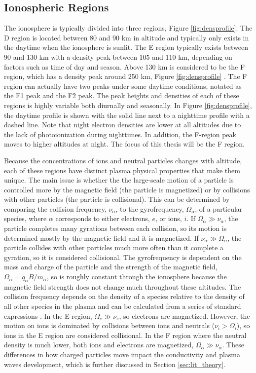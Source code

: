 \subsection{Ionospheric Regions}
\label{sec:ionosphere_regions}
The ionosphere is typically divided into three regions, Figure \ref{fig:densprofile}.  The D region is located between 80 and 90 km in altitude and typically only exists in the daytime when the ionosphere is sunlit.  The E region typically exists between 90 and 130 km with a density peak between 105 and 110 km, depending on factors such as time of day and season.  Above 130 km is considered to be the F region, which has a density peak around 250 km, Figure \ref{fig:densprofile} \citet{Luhmann1995}.  The F region can actually have two peaks under some daytime conditions, notated as the F1 peak and the F2 peak.  The peak heights and densities of each of these regions is highly variable both diurnally and seasonally.  In Figure \ref{fig:densprofile}, the daytime profile is shown with the solid line next to a nighttime profile with a dashed line.  Note that night electron densities are lower at all altitudes due to the lack of photoionization during nighttimes.  In addition, the F-region peak moves to higher altitudes at night.  The focus of this thesis will be the F region.

Because the concentrations of ions and neutral particles changes with altitude, each of these regions have distinct plasma physical properties that make them unique.  The main issue is whether the the large-scale motion of a particle is controlled more by the magnetic field (the particle is magnetized) or by collisions with other particles (the particle is collisional).  This can be determined by comparing the collision frequency, \(\nu_\alpha\), to the gyrofrequency, \(\Omega_\alpha\), of a particular species, where \(\alpha\) corresponds to either electrons, \(e\), or ions, \(i\).  If \(\Omega_\alpha \gg \nu_\alpha\), the particle completes many gyrations between each collision, so its motion is determined mostly by the magnetic field and it is magnetized.  If \(\nu_\alpha \gg \Omega_\alpha\), the particle collides with other particles much more often than it complete a gyration, so it is considered collisional.  The gyrofrequency is dependent on the mass and charge of the particle and the strength of the magnetic field, \(\Omega_\alpha = q_\alpha B/m_\alpha\), so is roughly constant through the ionosphere because the magnetic field strength does not change much throughout these altitudes.  The collision frequency depends on the density of a species relative to the density of all other species in the plasma and can be calculated from a series of standard expressions \citep{Schunk1980,Schunk2009}.  In the E region, \(\Omega_e \gg \nu_e\), so electrons are magnetized.  However, the motion on ions is dominated by collisions between ions and neutrals (\(\nu_i > \Omega_i\)), so ions in the E region are considered collisional.  In the F region where the neutral density is much lower, both ions and electrons are magnetized, \(\Omega_\alpha \gg \nu_\alpha\).  These differences in how charged particles move impact the conductivity and plasma waves development, which is further discussed in Section \ref{sec:lit_theory}.

